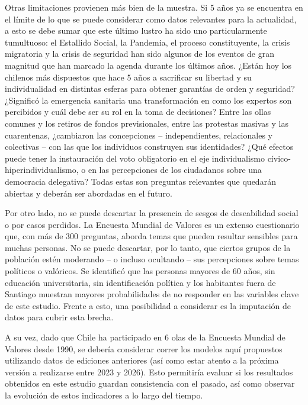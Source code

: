 \documentclass[12pt,twoside]{templates/facsothesis}
\begin{document}
Otras limitaciones provienen más bien de la muestra. Si 5 años ya se encuentra en el límite de lo que se puede considerar como datos relevantes para la actualidad, a esto se debe sumar que este último lustro ha sido uno particularmente tumultuoso: el Estallido Social, la Pandemia, el proceso constituyente, la crisis migratoria y la crisis de seguridad han sido algunos de los eventos de gran magnitud que han marcado la agenda durante los últimos años. ¿Están hoy los chilenos más dispuestos que hace 5 años a sacrificar su libertad y su individualidad en distintas esferas para obtener garantías de orden y seguridad? ¿Significó la emergencia sanitaria una transformación en como los expertos son percibidos y cuál debe ser su rol en la toma de decisiones? Entre las ollas comunes y los retiros de fondos previsionales, entre las protestas masivas y las cuarentenas, ¿cambiaron las concepciones -- independientes, relacionales y colectivas -- con las que los individuos construyen sus identidades? ¿Qué efectos puede tener la instauración del voto obligatorio en el eje individualismo cívico-hiperindividualismo, o en las percepciones de los ciudadanos sobre una democracia delegativa? Todas estas son preguntas relevantes que quedarán abiertas y deberán ser abordadas en el futuro.

Por otro lado, no se puede descartar la presencia de sesgos de deseabilidad social o por casos perdidos. La Encuesta Mundial de Valores es un extenso cuestionario que, con más de 300 preguntas, aborda temas que pueden resultar sensibles para muchas personas. No se puede descartar, por lo tanto, que ciertos grupos de la población estén moderando -- o incluso ocultando -- sus percepciones sobre temas políticos o valóricos. Se identificó que las personas mayores de 60 años, sin educación universitaria, sin identificación política y los habitantes fuera de Santiago muestran mayores probabilidades de no responder en las variables clave de este estudio. Frente a esto, una posibilidad a considerar es la imputación de datos para cubrir esta brecha.

A su vez, dado que Chile ha participado en 6 olas de la Encuesta Mundial de Valores desde 1990, se debería considerar correr los modelos aquí propuestos utilizando datos de ediciones anteriores (así como estar atento a la próxima versión a realizarse entre 2023 y 2026). Esto permitiría evaluar si los resultados obtenidos en este estudio guardan consistencia con el pasado, así como observar la evolución de estos indicadores a lo largo del tiempo.
\end{document}
